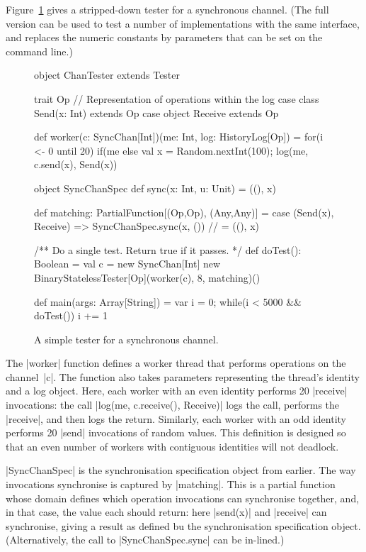 Figure~\ref{fig:ChanTester} gives a stripped-down tester for a synchronous
channel.  (The full version can be used to test a number of implementations
with the same interface, and replaces the numeric constants by parameters that
can be set on the command line.)


\begin{figure}
\begin{scala}
object ChanTester extends Tester{
  trait Op   // Representation of operations within the log
  case class Send(x: Int) extends Op
  case object Receive extends Op

  def worker(c: SyncChan[Int])(me: Int, log: HistoryLog[Op]) = 
    for(i <- 0 until 20)
      if(me%
      else{ val x = Random.nextInt(100); log(me, c.send(x), Send(x)) }

  object SyncChanSpec{
    def sync(x: Int, u: Unit) = ((), x)    
  }

  def matching: PartialFunction[(Op,Op), (Any,Any)] = {
    case (Send(x), Receive) => SyncChanSpec.sync(x, ()) // = ((), x)
  }

  /** Do a single test.  Return true if it passes. */
  def doTest(): Boolean = {
    val c = new SyncChan[Int]
    new BinaryStatelessTester[Op](worker(c), 8, matching)()
  }

  def main(args: Array[String]) = {
    var i = 0; while(i < 5000 && doTest()) i += 1
  }
}
\end{scala}
\caption{A simple tester for a synchronous channel. \label{fig:ChanTester}}
\end{figure}


The |worker| function defines a worker thread that performs operations on the
channel~|c|.  The function also takes parameters representing the thread's
identity and a log object.  Here, each worker with an even identity performs
20 |receive| invocations: the call |log(me, c.receive(), Receive)| logs the
call, performs the |receive|, and then logs the return.  Similarly, each
worker with an odd identity performs 20 |send| invocations of random values.
This definition is designed so that an even number of workers with contiguous
identities will not deadlock. 

|SyncChanSpec| is the synchronisation specification object from earlier.  The
way invocations synchronise is captured by |matching|.  This is a partial
function whose domain defines which operation invocations can synchronise
together, and, in that case, the value each should return: here |send(x)| and
|receive| can synchronise, giving a result as defined bu the synchronisation
specification object.  (Alternatively, the call to |SyncChanSpec.sync| can be
in-lined.)

